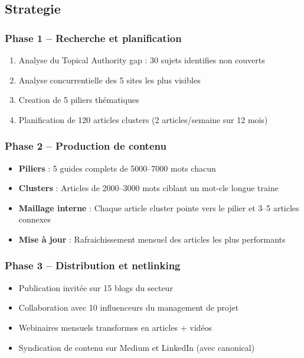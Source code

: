 \documentclass[12pt,a4paper,twoside]{report}
\begin{document}
\subsection{Strategie}

\subsubsection{Phase 1 -- Recherche et planification}
\begin{enumerate}
    \item Analyse du Topical Authority gap : 30 sujets identifies non couverts
    \item Analyse concurrentielle des 5 sites les plus visibles
    \item Creation de 5 piliers thématiques
    \item Planification de 120 articles clusters (2 articles/semaine sur 12 mois)
\end{enumerate}

\subsubsection{Phase 2 -- Production de contenu}
\begin{itemize}
    \item \textbf{Piliers} : 5 guides complets de 5000--7000 mots chacun
    \item \textbf{Clusters} : Articles de 2000--3000 mots ciblant un mot-cle longue traine
    \item \textbf{Maillage interne} : Chaque article cluster pointe vers le pilier et 3--5 articles connexes
    \item \textbf{Mise à jour} : Rafraichissement mensuel des articles les plus performants
\end{itemize}

\subsubsection{Phase 3 -- Distribution et netlinking}
\begin{itemize}
    \item Publication invitée sur 15 blogs du secteur
    \item Collaboration avec 10 influenceurs du management de projet
    \item Webinaires mensuels transformes en articles + vidéos
    \item Syndication de contenu sur Medium et LinkedIn (avec canonical)
\end{itemize}
\end{document}

